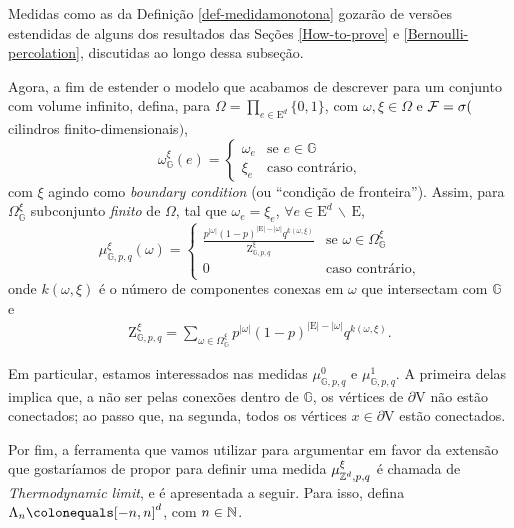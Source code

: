 Medidas como as da Definição \ref{def-medidamonotona} gozarão de versões estendidas de alguns dos resultados das Seções \ref{How-to-prove} e \ref{Bernoulli-percolation}, discutidas ao longo dessa subseção. 

Agora, a fim de estender o modelo que acabamos de descrever para um conjunto com volume infinito, defina, para $\Omega = \prod_{e \in \text{E}^d} \{0, 1\}$, com $\omega, \xi \in \Omega$ e $\operatorname{\mathcal{F}} = \sigma($cilindros finito-dimensionais$)$,
\[\omega_{\mathbb{G}}^{\xi}(e) = 
\begin{cases}
\omega_e & \text{se } e \in \mathbb{G} \\
\xi_e & \text{caso contrário},
\end{cases}
\]
com $\xi$ agindo como \textit{boundary condition} (ou ``condição de fronteira''). Assim, para $\Omega_{\mathbb{G}}^{\xi}$ subconjunto \textit{finito} de $\Omega$, tal que $\omega_e = \xi_e$, $\forall e \in \text{E}^d \, \backslash \, \text{E}$,
\[\mu_{\mathbb{G}, p, q}^\xi(\omega) = 
\begin{cases}
\frac{p^{|\omega|} (1 - p)^{|\text{E}| - |\omega|} q^{k(\omega, \xi)}}{\text{Z}_{\mathbb{G}, p, q}^{\xi}} & \text{se } \omega \in \Omega_{\mathbb{G}}^{\xi} \\
0 & \text{caso contrário},
\end{cases}
\]
onde $k(\omega, \xi)$ é o número de componentes conexas em $\omega$ que intersectam com $\mathbb{G}$ e
\begin{align*}
\text{Z}_{\mathbb{G}, p , q}^{\xi} = \sum_{\omega \in \Omega_{\mathbb{G}}^{\xi}} p^{|\omega|} (1 - p)^{|\text{E}| - |\omega|} q^{k(\omega, \xi)}.
\end{align*} 

Em particular, estamos interessados nas medidas $\mu_{\mathbb{G}, p, q}^0$ e $\mu_{\mathbb{G}, p, q}^1$. A primeira delas implica que, a não ser pelas conexões dentro de $\mathbb{G}$, os vértices de $\partial\text{V}$ não estão conectados; ao passo que, na segunda, todos os vértices $x \in \partial\text{V}$ estão conectados.

Por fim, a ferramenta que vamos utilizar para argumentar em favor da extensão que gostaríamos de propor para definir uma medida $\mu_{\operatorname{\mathbb{Z}}^d, p, q}^{\xi}$ é chamada de \textit{Thermodynamic limit}, e é apresentada a seguir. Para isso, defina $\Lambda_n \colonequals [-n, n]^d$, com $n \in \operatorname{\mathbb{N}}$.

